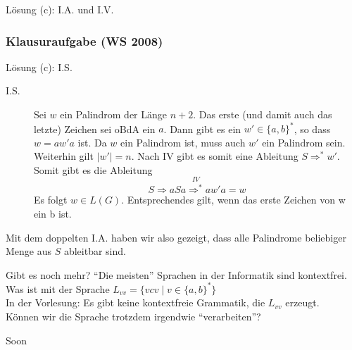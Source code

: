 {\begin{frame}
\begin{block}{Lösung (c): I.A. und I.V.}
\begin{description}
	\end{description}
	\end{block}
\end{frame}

\begin{frame}
	\frametitle{Klausuraufgabe (WS 2008)}
	\begin{block}{Lösung (c): I.S.}
		\begin{description}
			\item[I.S.] Sei $w$ ein Palindrom der Länge $n + 2$. Das erste (und damit auch das letzte) Zeichen sei oBdA ein $a$. Dann gibt es ein $w' \in \{a, b\}^\ast$, so dass $w = aw'a$ ist. Da $w$ ein Palindrom ist, muss auch $w'$ ein Palindrom sein. Weiterhin gilt $|w'| = n$. \pause Nach IV gibt es somit eine Ableitung $S \Rightarrow^\ast w'$. Somit gibt es die Ableitung $$S \Rightarrow aSa \overset{IV}{\Rightarrow^\ast} aw'a = w$$ Es folgt $w \in L(G)$. \pause Entsprechendes gilt, wenn das erste Zeichen von w ein b ist. \\ 
		\end{description}
		Mit dem doppelten I.A. haben wir also gezeigt, dass alle Palindrome beliebiger Menge aus $S$ ableitbar sind.
	\end{block}

\end{frame}

\begin{frame}{Gibt es noch mehr?}
	\enquote{Die meisten} Sprachen in der Informatik sind kontextfrei.\\[1em]
	Was ist mit der Sprache $L_{vv} = \{vcv \mid v \in \{a, b\}^*\}$\\
	\pause
	In der Vorlesung: Es gibt keine kontextfreie Grammatik, die $L_{vv}$ erzeugt.\\
	\pause
	Können wir die Sprache trotzdem irgendwie \enquote{verarbeiten}?
	
	\begin{block}{}
		\Large
		\centering
		Soon\\[1em]
	\end{block}
\end{frame}
}
